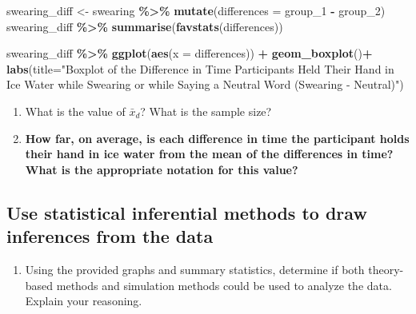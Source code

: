 \documentclass[
]{report}
\newenvironment{Shaded}{\begin{snugshade}}{\end{snugshade}}
\newcommand{\AttributeTok}[1]{\textcolor[rgb]{0.13,0.29,0.53}{#1}}
\newcommand{\FunctionTok}[1]{\textcolor[rgb]{0.13,0.29,0.53}{\textbf{#1}}}
\newcommand{\NormalTok}[1]{#1}
\newcommand{\OtherTok}[1]{\textcolor[rgb]{0.56,0.35,0.01}{#1}}
\newcommand{\SpecialCharTok}[1]{\textcolor[rgb]{0.81,0.36,0.00}{\textbf{#1}}}
\newcommand{\StringTok}[1]{\textcolor[rgb]{0.31,0.60,0.02}{#1}}
\providecommand{\tightlist}{%
  \setlength{\itemsep}{0pt}\setlength{\parskip}{0pt}}
\begin{document}
\begin{Shaded}
\begin{Highlighting}[]
\NormalTok{swearing\_diff }\OtherTok{\textless{}{-}}\NormalTok{ swearing }\SpecialCharTok{\%\textgreater{}\%} 
  \FunctionTok{mutate}\NormalTok{(}\AttributeTok{differences =}\NormalTok{ group\_1 }\SpecialCharTok{{-}}\NormalTok{ group\_2)}
\NormalTok{swearing\_diff }\SpecialCharTok{\%\textgreater{}\%} 
    \FunctionTok{summarise}\NormalTok{(}\FunctionTok{favstats}\NormalTok{(differences))}

\NormalTok{swearing\_diff }\SpecialCharTok{\%\textgreater{}\%} 
    \FunctionTok{ggplot}\NormalTok{(}\FunctionTok{aes}\NormalTok{(}\AttributeTok{x =}\NormalTok{ differences)) }\SpecialCharTok{+}
    \FunctionTok{geom\_boxplot}\NormalTok{()}\SpecialCharTok{+}
    \FunctionTok{labs}\NormalTok{(}\AttributeTok{title=}\StringTok{"Boxplot of the Difference in Time Participants Held Their Hand }
\StringTok{         in Ice Water while Swearing or while Saying a Neutral Word (Swearing {-} Neutral)"}\NormalTok{)}
\end{Highlighting}
\end{Shaded}

\begin{enumerate}
\def\labelenumi{\arabic{enumi}.}
\setcounter{enumi}{5}
\item
  What is the value of \(\bar{x}_d\)? What is the sample size?
  \vspace{0.25in}
\item
  \textbf{How far, on average, is each difference in time the participant holds their hand in ice water from the mean of the differences in time? What is the appropriate notation for this value?}
\end{enumerate}

\vspace{0.4in}

\subsection*{Use statistical inferential methods to draw inferences from the data}\label{use-statistical-inferential-methods-to-draw-inferences-from-the-data-2}

\begin{enumerate}
\def\labelenumi{\arabic{enumi}.}
\setcounter{enumi}{7}
\tightlist
\item
  Using the provided graphs and summary statistics, determine if both theory-based methods and simulation methods could be used to analyze the data. Explain your reasoning.
\end{enumerate}
\end{document}
